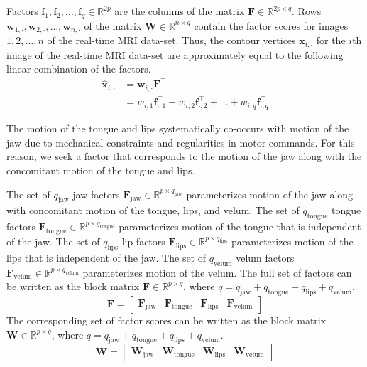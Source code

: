 \documentclass[preprint]{JASAnew}\usepackage[]{graphicx}\usepackage[]{color}
\begin{document}
Factors $\mathbf{f}_1, \mathbf{f}_2, \ldots, \mathbf{f}_q \in \mathbb{R}^{2p}$ are the columns of the matrix $\mathbf{F} \in \mathbb{R}^{2p\times q}$. 
%
Rows $\mathbf{w}_{1,\cdot},\mathbf{w}_{2,\cdot},\ldots,\mathbf{w}_{n,\cdot}$ of the matrix $\mathbf{W} \in \mathbb{R}^{n\times q}$ contain the factor scores for images $1,2,\ldots,n$ of the real-time MRI data-set. 
%
Thus, the contour vertices $\mathbf{x}_{i,\cdot}$ for the $i$th image of the real-time MRI data-set are approximately equal to the following linear combination of the factors. 
%
\begin{align}
\label{eq:linearcombo}
\mathbf{\hat{x}}_{i,\cdot}
 &=
  \mathbf{w}_{i,\cdot} \mathbf{F}^\intercal \\
 &=
  w_{i,1} \mathbf{f}_{\cdot,1}^\intercal
  + w_{i,2} \mathbf{f}_{\cdot,2}^\intercal
  + \ldots
  + w_{i,q} \mathbf{f}_{\cdot,q}^\intercal
\end{align}




The motion of the tongue and lips systematically co-occurs with motion of the jaw due to mechanical constraints and regularities in motor commands. For this reason, we seek a factor that corresponds to the motion of the jaw along with the concomitant motion of the tongue and lips.


The set of $q_\text{jaw}$ jaw factors $\mathbf{F}_\text{jaw} \in \mathbb{R}^{p\times q_\text{jaw}}$ parameterizes motion of the jaw along with concomitant motion of the tongue, lips, and velum.
%
The set of $q_\text{tongue}$ tongue factors $\mathbf{F}_\text{tongue} \in \mathbb{R}^{p\times q_\text{tongue}}$ parameterizes motion of the tongue that is independent of the jaw. 
%
The set of $q_\text{lips}$ lip factors $\mathbf{F}_\text{lips} \in \mathbb{R}^{p\times q_\text{lips}}$ parameterizes motion of the lips that is independent of the jaw.
%
The set of $q_\text{velum}$ velum factors $\mathbf{F}_\text{velum} \in \mathbb{R}^{p\times q_\text{velum}}$ parameterizes motion of the velum.
%
The full set of factors can be written as the block matrix $\mathbf{F} \in \mathbb{R}^{p\times q}$, where $q=q_\text{jaw}+q_\text{tongue}+q_\text{lips}+q_\text{velum}$. 
% 
\begin{equation}
\label{eq:Fblock}
\mathbf{F} = 
\left[
\begin{array}{c|c|c|c}
\mathbf{F}_\text{jaw} 
& \mathbf{F}_\text{tongue}
& \mathbf{F}_\text{lips}
& \mathbf{F}_\text{velum}
\end{array}
\right]
\end{equation}
%
The corresponding set of factor scores can be written as the block matrix $\mathbf{W} \in \mathbb{R}^{p\times q}$, where $q=q_\text{jaw}+q_\text{tongue}+q_\text{lips}+q_\text{velum}$. 
% 
\begin{equation}
\label{eq:Wblock}
\mathbf{W} = 
\left[
\begin{array}{c|c|c|c}
\mathbf{W}_\text{jaw} 
& \mathbf{W}_\text{tongue}
& \mathbf{W}_\text{lips}
& \mathbf{W}_\text{velum}
\end{array}
\right]
\end{equation}
\end{document}
